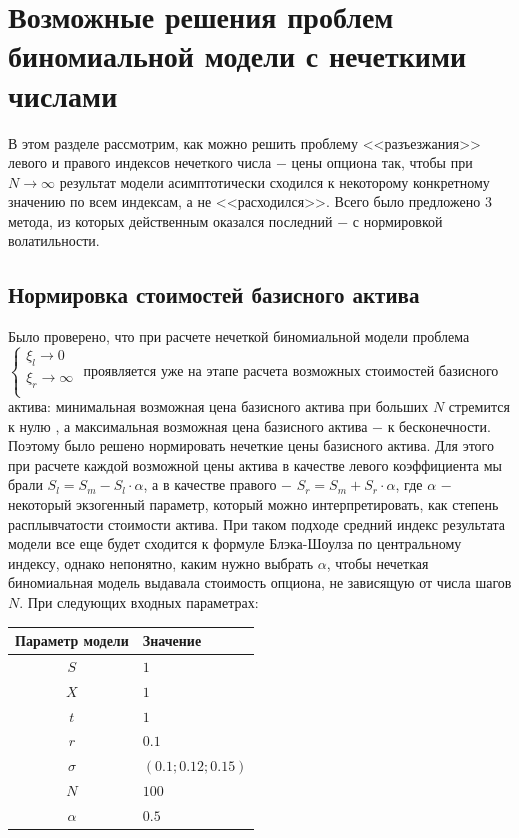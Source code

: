\documentclass[a4paper, 12pt]{extarticle}
\begin{document}
	\section{Возможные решения проблем биномиальной модели с нечеткими числами}
	В этом разделе рассмотрим, как можно решить проблему <<разъезжания>> левого и правого индексов нечеткого числа $-$ цены опциона так, чтобы при $N \to \infty$ результат модели асимптотически сходился к некоторому конкретному значению по всем индексам, а не <<расходился>>. Всего было предложено $3$ метода, из которых действенным оказался последний $-$ с нормировкой волатильности. 
	
	\subsection{Нормировка стоимостей базисного актива}
	Было проверено, что при расчете нечеткой биномиальной модели проблема 
	$\begin{cases}
		\xi_l \to 0 \\
		\xi_r \to \infty \\
	\end{cases}$ 
	проявляется уже на этапе расчета возможных стоимостей базисного актива: минимальная возможная цена базисного актива при больших $N$ стремится к нулю , а максимальная возможная цена базисного актива $-$ к бесконечности. Поэтому было решено нормировать нечеткие цены базисного актива. Для этого при расчете каждой возможной цены актива в качестве левого коэффициента мы брали $S_l = S_m - S_l \cdot \alpha$, а в качестве правого $-$ $S_r = S_m + S_r \cdot \alpha$, где $\alpha$ $-$ некоторый экзогенный параметр, который можно интерпретировать, как степень расплывчатости стоимости актива. При таком подходе средний индекс результата модели все еще будет сходится к формуле Блэка-Шоулза по центральному индексу, однако непонятно, каким нужно выбрать $\alpha$, чтобы нечеткая биномиальная модель выдавала стоимость опциона, не зависящую от числа шагов $N$. При следующих входных параметрах:
	 \begin{center}
	 	\begin{tabular}{|c|l|}
	 		\hline
	 		\textbf{Параметр модели} & \textbf{Значение} \\
	 		\hline
	 		$S$ & $1$ \\
	 		$X$ & $1$ \\
	 		$t$ & $1$ \\
	 		$r$ & $0.1$ \\
	 		$\sigma$ & $(0.1; 0.12; 0.15)$ \\
	 		$N$ & $100$ \\
	 		$\alpha$ & $0.5$ \\
	 		\hline
	 	\end{tabular}
	 \end{center}
	 
\end{document}
